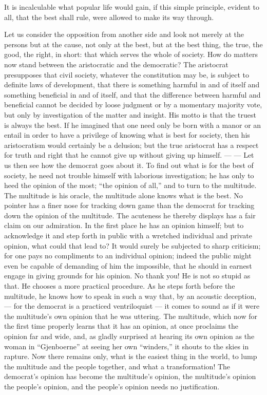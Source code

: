 \documentclass[12pt,a4paper,openany]{book}
\newcommand{\opage}[1]{\marginnote{\footnotesize\textit{[#1]}}}
\begin{document}
It is incalculable what popular life would gain,
if this simple principle, evident to all,
that the best shall rule, were allowed to make its way
through.

Let us consider the opposition from another side
and look not merely at the persons but at the cause, not
\setcounter{footnote}{0}%
\opage{78}only at the best, but at the best thing, the true,
the good, the right, in short: that which serves the whole of society.
How do matters now stand between
the aristocratic and the democratic? The aristocrat
presupposes that civil society, whatever
the constitution may be, is subject to definite laws of development,
that there is something harmful in and of itself and something
beneficial in and of itself, and that the difference between harmful
and beneficial cannot be decided by loose judgment or
by a momentary majority vote, but only by investigation of the matter
and insight. His motto is that the truest
is always the best. If he imagined
that one need only be born with a manor
or an entail in order to have a privilege
of knowing what is best for society, then
his aristocratism would certainly be a delusion; but
the true aristocrat has a respect for truth and
right that he cannot give up without giving up himself.
--- --- Let us then see how the democrat goes about it.
To find out what is for the best of society, he
need not trouble himself with laborious investigation;
he has only to heed the opinion of the most;
``the opinion of all,'' and to turn to the multitude.
The multitude is his oracle, the multitude alone knows what
is the best. No pointer has a finer nose for
tracking down game than the democrat for tracking down
the opinion of the multitude. The acuteness he thereby
displays has a fair claim on our admiration.
In the first place he has an opinion himself; but to acknowledge
it and step forth in public with a wretched
individual and private opinion, what could that lead to?
It would surely be subjected to sharp criticism; for
\setcounter{footnote}{0}%
\opage{79}one pays no compliments to an individual opinion;
indeed the public might even be capable of demanding
of him the impossible, that he should in earnest
engage in giving grounds for his opinion. No thank you!
He is not so stupid as that. He chooses a more practical
procedure. As he steps forth before the multitude,
he knows how to speak in such a way that, by an acoustic
deception, --- for the democrat is a practiced ventriloquist ---
it comes to sound as if it were the multitude's own
opinion that he was uttering. The multitude, which now for the first time properly
learns that it has an opinion, at once proclaims
the opinion far and wide, and, as gladly surprised
at hearing its own opinion as the woman in ``Gjenboerne''
at seeing her own ``winders,'' it shouts to the skies
in rapture. Now there remains only, what is
the easiest thing in the world, to lump the multitude and
the people together, and what a transformation! The democrat's
opinion has become the multitude's opinion, the multitude's
opinion the people's opinion, and the people's opinion needs
no justification.
\end{document}
